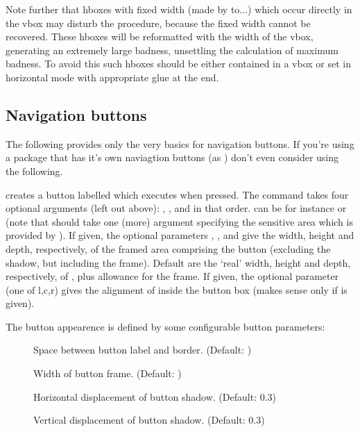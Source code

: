 \documentclass[12pt]{scrartcl}
\let\newslide=\relax
\begin{document}
  \newslide

  Note further that hboxes with fixed width
  (made by  to...) which occur directly in the vbox may disturb
  the procedure, because the fixed width cannot be recovered. These hboxes will
  be reformatted with the width of the vbox, generating an extremely large
  badness, unsettling the calculation of maximum badness. To avoid this such
  hboxes should be either contained in a vbox or set in horizontal mode with
  appropriate glue at the end.

  \newslide

  \subsection{Navigation buttons}
  The following provides only the very basics for navigation buttons. If you're
  using a package that has it's own naviagtion buttons (as
  \href{ftp://ftp.dante.de/tex-archive/help/Catalogue/entries/pdfscreen.html}%
  {}) don't even consider using the following.

  creates a button labelled  which executes  when
  pressed. The command takes four optional arguments (left out above):
  , ,  and  in that order.
   can be for instance  or
   (note that  should take
  one (more) argument specifying the sensitive area which is provided by
  ).  If given, the optional parameters , , and
   give the width, height and depth, respectively, of the framed
  area comprising the button (excluding the shadow, but including the
  frame). Default are the `real' width, height and depth, respectively, of
  , plus allowance for the frame.  If given, the optional parameter
   (one of l,c,r) gives the alignment of  inside the
  button box (makes sense only if  is given).

  The button appearence is defined by some configurable button parameters:
  \begin{description}
  \item[]
    Space between button label and border. (Default: )

  \item[]
    Width of button frame. (Default: \code{0pt})

  \item[]
    Horizontal displacement of button shadow. (Default: 0.3)

  \item[]
    Vertical displacement of button shadow. (Default: 0.3)
  \end{description}
\end{document}
